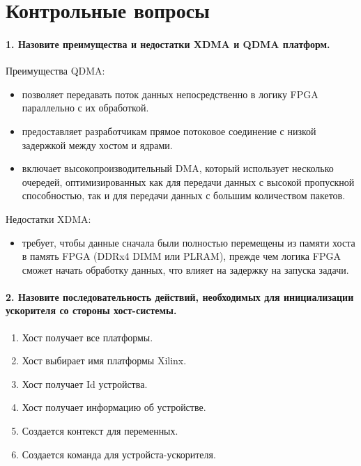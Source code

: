 \chapter*{Контрольные вопросы}

\subsubsection{1. Назовите преимущества и недостатки XDMA и QDMA платформ.}

Преимущества QDMA:
\begin{itemize}
	\item позволяет передавать поток данных непосредственно в логику FPGA параллельно с их обработкой.
	\item предоставляет разработчикам прямое потоковое соединение с низкой задержкой между хостом и ядрами.
	\item включает высокопроизводительный DMA, который использует несколько очередей, оптимизированных как для передачи данных с высокой пропускной способностью, так и для передачи данных с большим количеством пакетов.
\end{itemize}

Недостатки XDMA:
\begin{itemize}
	\item требует, чтобы данные сначала были полностью перемещены из памяти хоста в память FPGA (DDRx4 DIMM или PLRAM), прежде чем логика FPGA сможет начать обработку данных, что влияет на задержку на запуска задачи.
\end{itemize}

\subsubsection{2. Назовите последовательность действий, необходимых для инициализации ускорителя со стороны хост-системы.}

\begin{enumerate}
	\item Хост получает все платформы.
	\item Хост выбирает имя платформы Xilinx.
	\item Хост получает Id устройства.
	\item Хост получает информацию об устройстве.
	\item Создается контекст для переменных.
	\item Создается команда для устройста-ускорителя.
\end{enumerate}

